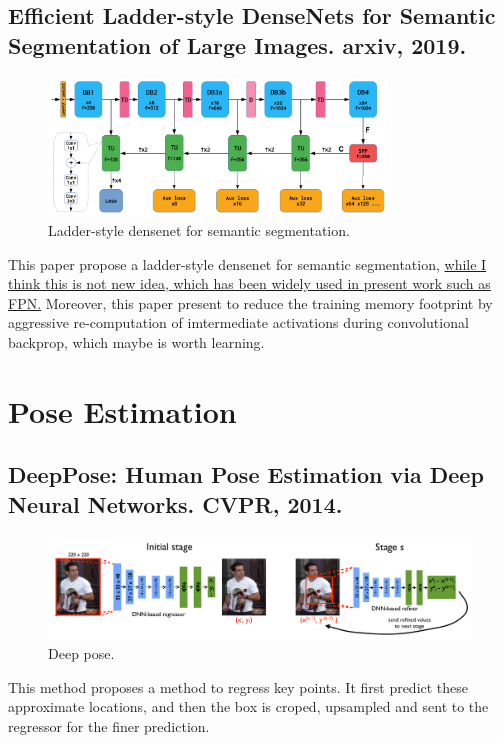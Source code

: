 \documentclass[10pt,onecolumn]{book}
\begin{document}
\section{Efficient Ladder-style DenseNets for Semantic Segmentation of Large Images. arxiv, 2019.}
\begin{figure}[h]
\centering
\includegraphics[width=0.8\textwidth]{figures_paper_reading/ladder_style_densenet.png}
\caption{Ladder-style densenet for semantic segmentation.}
\label{fig}
\end{figure}
This paper propose a ladder-style densenet for semantic segmentation, \uline{while I think this is not new idea, which has been widely used in present work such as FPN.} Moreover, this paper present to reduce the training memory footprint by aggressive re-computation of imtermediate activations during convolutional backprop, which maybe is worth learning. 

\chapter{Pose Estimation}
\section{DeepPose: Human Pose Estimation via Deep Neural Networks. CVPR, 2014.}
\begin{figure}[h]
\centering
\includegraphics[width=1\textwidth]{figures_paper_reading/deeppose.png}
\caption{Deep pose.}
\label{fig}
\end{figure}
This method proposes a method to regress key points. It first predict these approximate locations, and then the box is croped, upsampled and sent to the regressor for the finer prediction.
\end{document}
